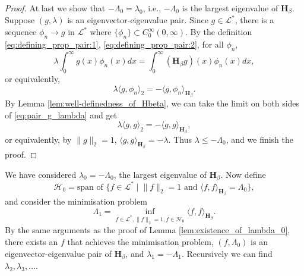 \documentclass[11pt, a4paper]{article}
\numberwithin{equation}{section}
\newcommand{\ie}{i.e.}
\newcommand{\Lstar}{\mathcal{L}^*}
\newcommand{\Hbeta}{\mathbf{H}_{\beta}}
\theoremstyle{definition}
\theoremstyle{remark}
\begin{document}
\begin{proof}
  At last we show that $-\Lambda_0 = \lambda_0$, \ie, $-\Lambda_0$ is the largest eigenvalue of $\Hbeta$. Suppose $(g, \lambda)$ is an eigenvector-eigenvalue pair. Since $g \in \Lstar$, there is a sequence $\phi_n \to g$ in $\Lstar$ where $\{ \phi_n \} \subset C^{\infty}_0(0, \infty)$. By the definition \eqref{eq:defining_prop_pair:1}, \eqref{eq:defining_prop_pair:2}, for all $\phi_n$,
  \begin{equation}
    \lambda \int^{\infty}_0 g(x) \phi_n(x) dx = \int^{\infty}_0 (\Hbeta g)(x) \phi_n(x) dx,
  \end{equation}
  or equivalently,
  \begin{equation} \label{eq:pair_g_lambda}
    \lambda \langle g, \phi_n \rangle_2 = -\langle g, \phi_n \rangle_{\Hbeta}.
  \end{equation}
  By Lemma \ref{lem:well-definedness_of_Hbeta}, we can take the limit on both sides of \eqref{eq:pair_g_lambda} and get
  \begin{equation}
    \lambda \langle g, g \rangle_2 = - \langle g, g \rangle_{\Hbeta},
  \end{equation}
  or equivalently, by $\lVert g \rVert_2 = 1$, $\langle g, g \rangle_{\Hbeta} = -\lambda$. Thus $\lambda \leq -\Lambda_0$, and we finish the proof.
\end{proof}

We have considered $\lambda_0 = -\Lambda_0$, the largest eigenvalue of $\Hbeta$. Now define
\begin{equation}
  \mathcal{H}_0 = \text{span of } \{ f \in \Lstar \mid \lVert f \rVert_2 = 1 \text{ and } \langle f, f \rangle_{\Hbeta} = \Lambda_0 \},
\end{equation}
and consider the minimisation problem
\begin{equation}
  \Lambda_1 = \inf_{f \in \Lstar, \lVert f \rVert_2 = 1, f \in \mathcal{H}_0} \langle f, f \rangle_{\Hbeta}.
\end{equation}
By the same arguments as the proof of Lemma \ref{lem:existence_of_lambda_0}, there exists an $f$ that achieves the minimisation problem, $(f, \Lambda_0)$ is an eigenvector-eigenvalue pair of $\Hbeta$, and $\lambda_1 = -\Lambda_1$. Recursively we can find $\lambda_2, \lambda_3, \dotsc$.
\end{document}
